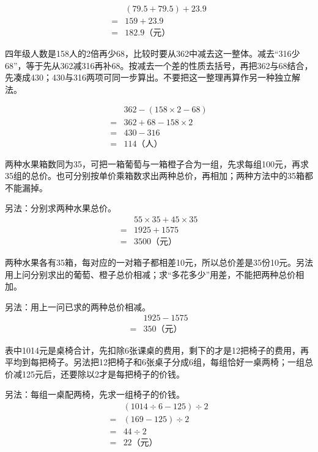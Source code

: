 \documentclass[multi=snippet,border=0pt]{standalone}
\newenvironment{snippet}[3]{\begin{minipage}{#1bp}\color{answerred}\fontsize{#2}{#3}\selectfont\raggedright}{\end{minipage}}
\begin{document}
\begin{snippet}{189}{10.5}{12.8}\[\begin{aligned}&(79.5+79.5)+23.9\\={}&159+23.9\\={}&182.9\text{（元）}\end{aligned}\]\end{snippet}
\begin{snippet}{505}{11.5}{14}四年级人数是158人的2倍再少68，比较时要从362中减去这一整体。减去“316少68”，等于先从362减316再补68。按减去一个差的性质去括号，再把362与68结合，先凑成430；430与316两项可同一步算出。不要把这一整理再算作另一种独立解法。\end{snippet}
\begin{snippet}{179}{10.5}{12.8}\[\begin{aligned}&362-(158\times2-68)\\={}&362+68-158\times2\\={}&430-316\\={}&114\text{（人）}\end{aligned}\]\end{snippet}
\begin{snippet}{505}{11.5}{14}两种水果箱数同为35，可把一箱葡萄与一箱橙子合为一组，先求每组100元，再求35组的总价。也可分别按单价乘箱数求出两种总价，再相加；两种方法中的35箱都不能漏掉。\par 另法：分别求两种水果总价。\[\begin{aligned}&55\times35+45\times35\\={}&1925+1575\\={}&3500\text{（元）}\end{aligned}\]\end{snippet}
\begin{snippet}{505}{11.5}{14}两种水果各有35箱，每对应的一对箱子都相差10元，所以总价差是35份10元。另法用上问分别求出的葡萄、橙子总价相减；求“多花多少”用差，不能把两种总价相加。\par 另法：用上一问已求的两种总价相减。\[\begin{aligned}&1925-1575\\={}&350\text{（元）}\end{aligned}\]\end{snippet}
\begin{snippet}{505}{11.5}{14}表中1014元是桌椅合计，先扣除6张课桌的费用，剩下的才是12把椅子的费用，再平均到每把椅子。另法把12把椅子和6张桌子分成6组，每组恰好一桌两椅；一组总价减125元后，还要除以2才是每把椅子的价钱。\par 另法：每组一桌配两椅，先求一组椅子的价钱。\[\begin{aligned}&(1014\div6-125)\div2\\={}&(169-125)\div2\\={}&44\div2\\={}&22\text{（元）}\end{aligned}\]\end{snippet}
\end{document}
